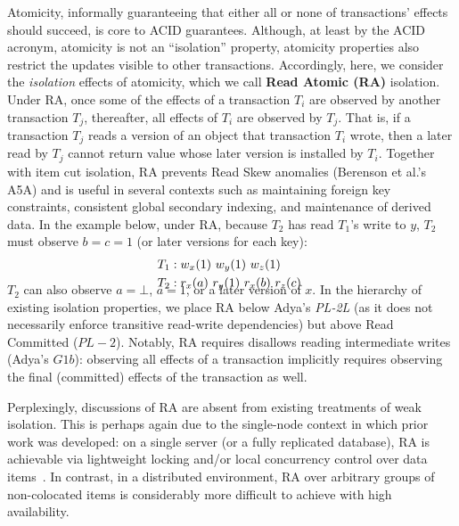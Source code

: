Atomicity, informally guaranteeing that either all or none of
transactions' effects should succeed, is core to ACID
guarantees. Although, at least by the ACID acronym, atomicity is not an
``isolation'' property, atomicity properties also restrict the updates
visible to other transactions. Accordingly, here, we consider the
\textit{isolation} effects of atomicity, which we call \textbf{Read
  Atomic (RA)} isolation.  Under RA, once some of the effects of a
transaction $T_i$ are observed by another transaction $T_j$,
thereafter, all effects of $T_i$ are observed by $T_j$. That is, if a
transaction $T_j$ reads a version of an object that transaction $T_i$
wrote, then a later read by $T_j$ cannot return value whose later
version is installed by $T_i$. Together with item cut isolation, RA
prevents Read Skew anomalies (Berenson et al.'s A5A) and is useful in
several contexts such as maintaining foreign key constraints,
consistent global secondary indexing, and maintenance of derived
data. In the example below, under RA, because $T_2$ has read $T_1$'s
write to $y$, $T_2$ must observe $b=c=1$ (or later versions for each
key):
\begin{align*}
\small
T_1 &: w_x(1)~w_y(1)~w_z(1)
\\T_2 &: r_x(a)~r_y(1)~r_x(b)~r_z(c)~\\[-1.5em]
\end{align*}
$T_2$ can also observe $a=\bot$, $a=1$, or a later version of $x$. In
the hierarchy of existing isolation properties, we place RA below
Adya's \textit{PL-2L} (as it does not necessarily enforce transitive
read-write dependencies) but above Read Committed ($PL-2$). Notably,
RA requires disallows reading intermediate writes (Adya's $G1b$):
observing all effects of a transaction implicitly requires observing
the final (committed) effects of the transaction as well.

Perplexingly, discussions of RA are absent from existing treatments of
weak isolation. This is perhaps again due to the single-node context
in which prior work was developed: on a single server (or a fully
replicated database), RA is achievable via lightweight locking and/or
local concurrency control over data items~\cite{gstore,
  kemme-thesis}. In contrast, in a distributed environment, RA over
arbitrary groups of non-colocated items is considerably more difficult
to achieve with high availability.


